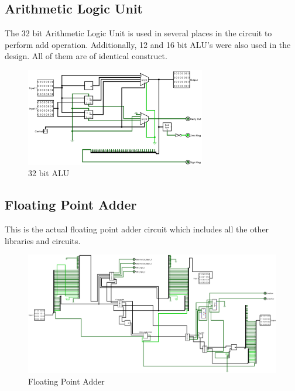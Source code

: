 \documentclass[12pt]{article}
\begin{document}
\subsection{Arithmetic Logic Unit}
The 32 bit Arithmetic Logic Unit is used in several places in the circuit to perform add operation. Additionally, 12 and 16 bit ALU's were also used in the design. All of them are of identical construct.
\begin{figure}[H]
    \centering
    \includegraphics[width=0.7\textwidth]{images/ALU_32_bit.jpg}
    \caption{32 bit ALU}
    \label{fig:alu}
\end{figure}

\subsection{Floating Point Adder}
This is the actual floating point adder circuit which includes all the other libraries and circuits.
\begin{figure}[H]
    \centering
        \includegraphics[width=\textwidth]{images/FPA.jpg}
    \caption{Floating Point Adder}\label{fig:fpa}
\end{figure}
\newpage
\end{document}
